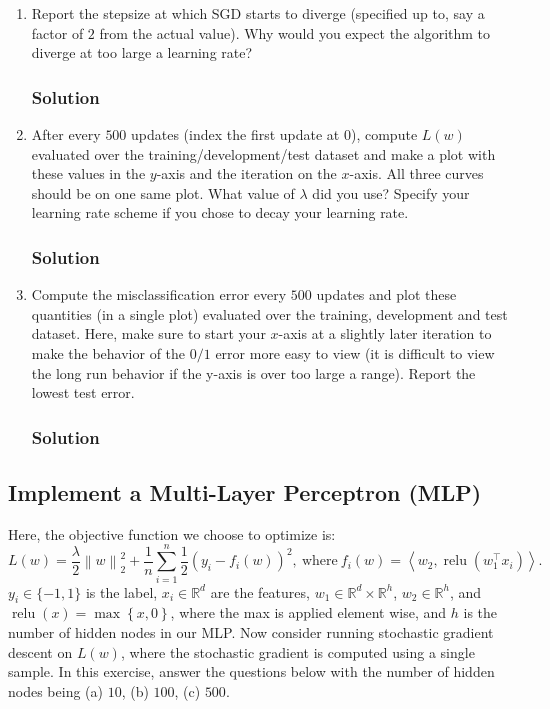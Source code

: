\documentclass[letterpaper,11pt]{article}
\begin{document}
\begin{enumerate}
\item Report the stepsize at which SGD starts to diverge (specified up to, say a
  factor of $2$ from the actual value). Why would you expect the algorithm to
  diverge at too large a learning rate?

  \subsubsection*{Solution}

\item After every $500$ updates (index the first update at $0$), compute $L(w)$
  evaluated over the training/development/test dataset and make a plot with
  these values in the $y$-axis and the iteration on the $x$-axis. All three
  curves should be on one same plot. What value of $\lambda$ did you use?
  Specify your learning rate scheme if you chose to decay your learning rate.

  \subsubsection*{Solution}
  
\item Compute the misclassification error every $500$ updates and plot these
  quantities (in a single plot) evaluated over the training, development and
  test dataset. Here, make sure to start your $x$-axis at a slightly later
  iteration to make the behavior of the $0/1$ error more easy to view (it is
  difficult to view the long run behavior if the y-axis is over too large a
  range). Report the lowest test error.

  \subsubsection*{Solution}
\end{enumerate}

\subsection*{Implement a Multi-Layer Perceptron (MLP)}

Here, the objective function we choose to optimize is:
\begin{equation}
  L(w) = \frac{\lambda}{2}\left\lVert w \right\rVert_2^2  + \frac{1}{n}\sum_{i=1}^n\frac{1}{2}\left(y_i - f_i(w)\right)^2,~\text{where}~
  f_i(w) = \left\langle w_2, \operatorname{relu}\left(w_1^\intercal x_i\right)\right\rangle.
\end{equation}
$y_i \in \{-1, 1\}$ is the label, $x_i \in \mathbb{R}^d$ are the features,
$w_1 \in \mathbb{R}^d \times \mathbb{R}^h$, $w_2 \in \mathbb{R}^h$, and
$\operatorname{relu}(x) = \max\left\{x, 0\right\}$, where the max is applied
element wise, and $h$ is the number of hidden nodes in our MLP.  Now consider
running stochastic gradient descent on $L(w)$, where the stochastic gradient is
computed using a single sample. In this exercise, answer the questions below
with the number of hidden nodes being (a) $10$, (b) $100$, (c) $500$.
\end{document}
